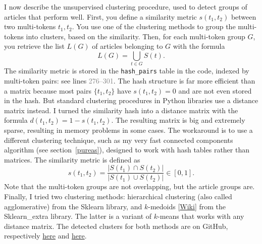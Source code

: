 \documentclass[oneside,10pt]{book}
\begin{document}
I now describe the unsupervised clustering procedure, used to detect groups of articles that perform well.  First, you define a 
\textcolor{index}{similarity metric} 
 $s(t_1, t_2)$ between
 two multi-tokens $t_1, t_2$. You use one of the clustering methods to group the multi-tokens into clusters, based on the similarity. Then, for each 
multi-token group $G$, you retrieve the list  $L(G)$ of articles belonging to $G$ with the formula
\begin{equation}
L(G) = \bigcup_{t\in G} S(t). \label{prozac4}
\end{equation}
The similarity metric is stored in the \texttt{hash\_pairs} table in the code, indexed by multi-token pairs: see lines \textcolor{gray}{276--301}. The hash structure is far more efficient than a matrix
 because most pairs $\{t_1, t_2\}$ have $s(t_1, t_2)=0$ and are not even stored in the hash. But standard clustering procedures in Python libraries use a
 distance matrix instead. I turned the similarity hash into a distance matrix with the formula $d(t_1, t_2) = 1- s(t_1, t_2)$. The resulting matrix 
is big and extremely sparse, resulting in memory problems in some cases. The workaround is to use a different clustering technique,
 such as my very fast \textcolor{index}{connected components} algorithm (see section~\ref{pureas}), designed to work with hash tables rather than matrices. The similarity metric is defined as
\begin{equation}
s(t_1, t_2) = \frac{|S(t_1) \cap S(t_2)|}{|S(t_1) \cup S(t_2)|}  \in [0, 1].
\end{equation}
Note that the multi-token groups are not overlapping, but the article groups are. Finally, I tried two clustering methods: 
 \textcolor{index}{hierarchical clustering} (also called agglomerative) from the \textcolor{index}{Sklearn} library,
 and \textcolor{index}{$k$-medoids}
 [\href{https://en.wikipedia.org/wiki/K-medoids}{Wiki}] from the
\textcolor{index}{Sklearn\_extra} library. 
The latter is a variant of \textcolor{index}{$k$-means } that works with any distance matrix. The detected clusters for both methods are on
 GitHub, respectively \href{https://github.com/VincentGranville/Statistical-Optimization/blob/main/nlp_scoring_clusters_hierarchical.txt}{here} 
 and \href{https://github.com/VincentGranville/Statistical-Optimization/blob/main/nlp_scoring_clusters_medoids.txt}{here}. 
\end{document}
